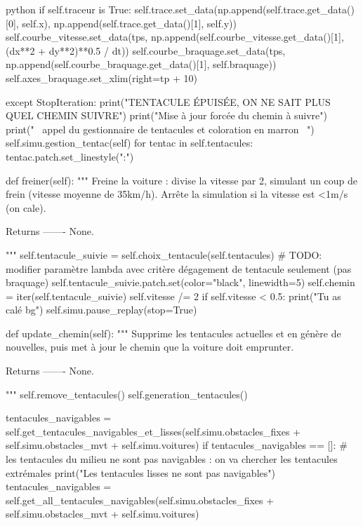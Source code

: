 \begin{mintedbox}{python}
            if self.traceur is True:
                self.trace.set_data(np.append(self.trace.get_data()[0], self.x), np.append(self.trace.get_data()[1], self.y))
            self.courbe_vitesse.set_data(tps, np.append(self.courbe_vitesse.get_data()[1], (dx**2 + dy**2)**0.5 / dt))
            self.courbe_braquage.set_data(tps, np.append(self.courbe_braquage.get_data()[1], self.braquage))
            self.axes_braquage.set_xlim(right=tp + 10)

        except StopIteration:
            print("TENTACULE ÉPUISÉE, ON NE SAIT PLUS QUEL CHEMIN SUIVRE")
            print("Mise à jour forcée du chemin à suivre")
            print("~ appel du gestionnaire de tentacules et coloration en marron ~")
            self.simu.gestion_tentac(self)
            for tentac in self.tentacules:
                tentac.patch.set_linestyle(":")

    def freiner(self):
        """
        Freine la voiture : divise la vitesse par 2, simulant un coup de frein (vitesse moyenne de 35km/h).
        Arrête la simulation si la vitesse est <1m/s (on cale).

        Returns
        -------
        None.

        """
        self.tentacule_suivie = self.choix_tentacule(self.tentacules)  # TODO: modifier paramètre lambda avec critère dégagement de tentacule seulement (pas braquage)
        self.tentacule_suivie.patch.set(color="black", linewidth=5)
        self.chemin = iter(self.tentacule_suivie)
        self.vitesse /= 2
        if self.vitesse < 0.5:
            print("Tu as calé bg")
            self.simu.pause_replay(stop=True)

    def update_chemin(self):
        """
        Supprime les tentacules actuelles et en génère de nouvelles, puis met à jour le chemin que la voiture doit emprunter.

        Returns
        -------
        None.

        """
        self.remove_tentacules()
        self.generation_tentacules()

        tentacules_navigables = self.get_tentacules_navigables_et_lisses(self.simu.obstacles_fixes + self.simu.obstacles_mvt + self.simu.voitures)
        if tentacules_navigables == []:  # les tentacules du milieu ne sont pas navigables : on va chercher les tentacules extrémales
            print("Les tentacules lisses ne sont pas navigables")
            tentacules_navigables = self.get_all_tentacules_navigables(self.simu.obstacles_fixes + self.simu.obstacles_mvt + self.simu.voitures)


\end{mintedbox}
